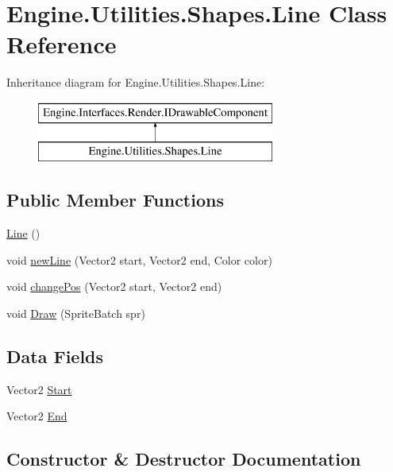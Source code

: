\hypertarget{a00606}{}\section{Engine.\+Utilities.\+Shapes.\+Line Class Reference}
\label{a00606}
Inheritance diagram for Engine.\+Utilities.\+Shapes.\+Line\+:\begin{figure}[H]
\begin{center}
\leavevmode
\includegraphics[height=2.000000cm]{d8/d00/a00606}
\end{center}
\end{figure}
\subsection*{Public Member Functions}
\begin{DoxyCompactItemize}
\item 
\hyperlink{a00606_a1697428d93616e1ee1b704f411cc375d}{Line} ()
\item 
void \hyperlink{a00606_a2f3c4a6adefdb08ed78ead11908b2fcb}{new\+Line} (Vector2 start, Vector2 end, Color color)
\item 
void \hyperlink{a00606_a4703c332038f44a1456db6882b6c2b33}{change\+Pos} (Vector2 start, Vector2 end)
\item 
void \hyperlink{a00606_a8500392559da764797cdb92eb850a2ba}{Draw} (Sprite\+Batch spr)
\end{DoxyCompactItemize}
\subsection*{Data Fields}
\begin{DoxyCompactItemize}
\item 
Vector2 \hyperlink{a00606_a0ccdb2e710193d9558ec7a7469365d29}{Start}
\item 
Vector2 \hyperlink{a00606_ab997faeaabf2b56432d38414a60e8f91}{End}
\end{DoxyCompactItemize}


\subsection{Constructor \& Destructor Documentation}
\mbox{\label{a00606_a1697428d93616e1ee1b704f411cc375d}} 
